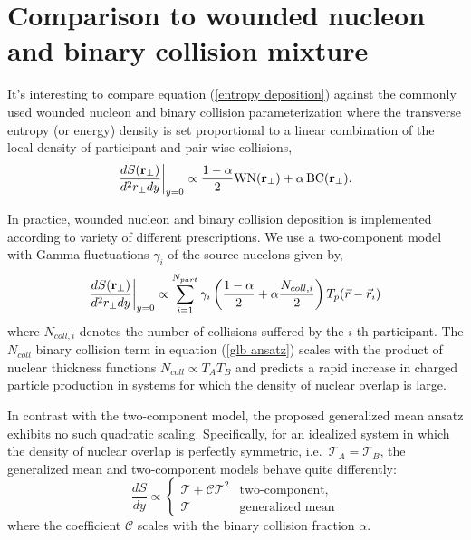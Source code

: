 \documentclass[aps,prl,reprint,amsmath,nofootinbib]{revtex4-1}
\begin{document}
\section{Comparison to wounded nucleon and binary collision mixture}

It's interesting to compare equation (\ref{entropy deposition}) against the commonly used wounded nucleon and
binary collision parameterization where the transverse entropy (or energy) density is set proportional to a
linear combination of the local density of participant and pair-wise collisions,
\begin{equation}
  \label{glb ansatz}
  \frac{dS({\bf r}_\perp)}{d^2r_\perp dy} \biggr \rvert_{y=0} \propto
  \frac{1-\alpha}{2}\mbox{WN}({\bf r_\perp}) + \alpha\, \mbox{BC}({\bf r_\perp}).
\end{equation}

In practice, wounded nucleon and binary collision deposition is implemented according to variety of different
prescriptions. We use a two-component model with Gamma fluctuations $\gamma_i$ of the source nucelons given
by,
\begin{equation}
  \label{glb algorithm}
  \frac{dS({\bf r}_\perp)}{d^2r_\perp dy} \biggr \rvert_{y=0} \propto
  \sum\limits_{i=1}^{N_{part}} \gamma_i \left(\frac{1-\alpha}{2} +
  \alpha \frac{N_{coll,i}}{2} \right ) T_p(\vec{r}-\vec{r}_i)
\end{equation}
where $N_{coll,i}$ denotes the number of collisions suffered by the $i$-th participant. The $N_{coll}$ binary
collision term in equation (\ref{glb ansatz}) scales with the product of nuclear thickness functions $N_{coll}
\propto T_A T_B$ and predicts a rapid increase in charged particle production in systems for which the density
of nuclear overlap is large.

In contrast with the two-component model, the proposed generalized mean ansatz exhibits no such quadratic
scaling. Specifically, for an idealized system in which the density of nuclear overlap is perfectly symmetric,
i.e.\ $\mathcal{T}_A = \mathcal{T}_B$, the generalized mean and two-component models behave quite differently:
\begin{equation}
  \label{symmetric scaling}
  \frac{dS}{dy} \propto
  \begin{cases}
    \mathcal{T} + \mathcal{C} \mathcal{T}^2 & \text{two-component,} \\
    \mathcal{T} & \text{generalized mean}
  \end{cases}
\end{equation}
where the coefficient $\mathcal{C}$ scales with the binary collision fraction $\alpha$.
\end{document}
